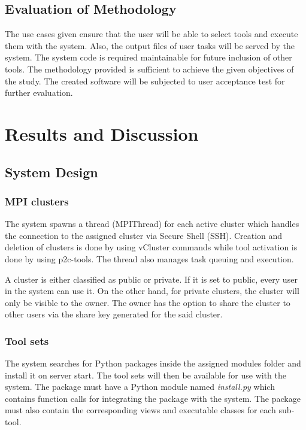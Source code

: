 \documentclass[journal]{./IEEE/IEEEtran}
\begin{document}
    \subsection {Evaluation of Methodology}
    	The use cases given ensure that the user will be able to select tools and execute them with the system. Also, the output files of user tasks will be served by the system. The system code is required maintainable for future inclusion of other tools.  
        The methodology provided is sufficient to achieve the given objectives of the study. The created software will be subjected to user acceptance test for further evaluation. 

\section{Results and Discussion}
	\subsection{System Design}
		\subsubsection{MPI clusters} 
		The system spawns a thread (MPIThread) for each active cluster which handles the connection to the assigned cluster via Secure Shell (SSH). Creation and deletion of clusters is done by using vCluster commands while tool activation is done by using p2c-tools. The thread also manages task queuing and execution.
		
		A cluster is either classified as public or private. If it is set to public, every user in the system can use it. On the other hand, for private clusters, the cluster will only be visible to the owner. The owner has the option to share the cluster to other users via the share key generated for the said cluster. 		

		\subsubsection{Tool sets} 
		The system searches for Python packages inside the assigned modules folder and install it on server start. The tool sets will then be available for use with the system. The package must have a Python module named \emph{install.py} which contains function calls for integrating the package with the system. The package must also contain the corresponding views and executable classes for each sub-tool.  
\end{document}
